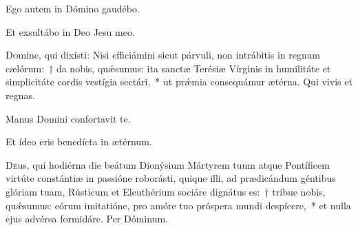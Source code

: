 \documentclass[vesperale_romanum.tex]{subfiles}
\begin{document}
 \vv Ego autem in Dómino gaudébo.
 
 \rr Et exsultábo in Deo Jesu meo.

\admagnificat


\oratio

\lettrine{D}{o}mine, qui dixísti: Nisi efficiámini sicut párvuli, non intrábitis in regnum cælórum:~† da nobis, quǽsumus: ita san\-ctæ Terésiæ Vírginis in humilitáte et simplicitáte cordis vestígia se\-ctári,~* ut prǽmia consequámur ætérna.
Qui vivis et regnas.



\ivesperisrubric

\hymnus


\vv Manus Domini confortavit te.

\rr Et ídeo eris benedícta in ætérnum.

\admagnificat



\myrule



\duplex

\oratio

\lettrine{D}{e}us, qui hodiérna die beátum Dionýsium Mártyrem tuum atque Pontíficem virtúte constántiæ in passióne roborásti, quique illi, ad prædicándum géntibus glóriam tuam, Rústicum et Eleuthérium sociáre dignátus es:~† tríbue nobis, quǽsumus: eórum imitatióne, pro amóre tuo próspera mundi despícere,~* et nulla ejus advérsa formidáre.
Per Dóminum.


\end{document}

